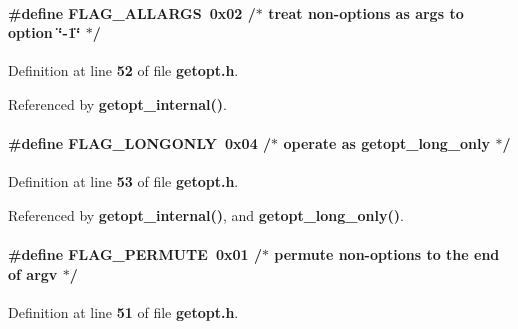 \paragraph[{F\+L\+A\+G\+\_\+\+A\+L\+L\+A\+R\+GS}]{\setlength{\rightskip}{0pt plus 5cm}\#define F\+L\+A\+G\+\_\+\+A\+L\+L\+A\+R\+GS~0x02	/$\ast$ treat non-\/options as args to option \char`\"{}-\/1\char`\"{} $\ast$/}\label{soapysdr_2apps_2msvc_2getopt_8h_a39578296f05cb6eeaab7bbcda14c7828}


Definition at line {\bf 52} of file {\bf getopt.\+h}.



Referenced by {\bf getopt\+\_\+internal()}.

\paragraph[{F\+L\+A\+G\+\_\+\+L\+O\+N\+G\+O\+N\+LY}]{\setlength{\rightskip}{0pt plus 5cm}\#define F\+L\+A\+G\+\_\+\+L\+O\+N\+G\+O\+N\+LY~0x04	/$\ast$ operate as getopt\+\_\+long\+\_\+only $\ast$/}\label{soapysdr_2apps_2msvc_2getopt_8h_a1c1f2fbb3773c9af64610d077ffe4d92}


Definition at line {\bf 53} of file {\bf getopt.\+h}.



Referenced by {\bf getopt\+\_\+internal()}, and {\bf getopt\+\_\+long\+\_\+only()}.

\paragraph[{F\+L\+A\+G\+\_\+\+P\+E\+R\+M\+U\+TE}]{\setlength{\rightskip}{0pt plus 5cm}\#define F\+L\+A\+G\+\_\+\+P\+E\+R\+M\+U\+TE~0x01	/$\ast$ permute non-\/options to the end of argv $\ast$/}\label{soapysdr_2apps_2msvc_2getopt_8h_a749f21f580ce8e232eec1cdfccbbdb29}


Definition at line {\bf 51} of file {\bf getopt.\+h}.



